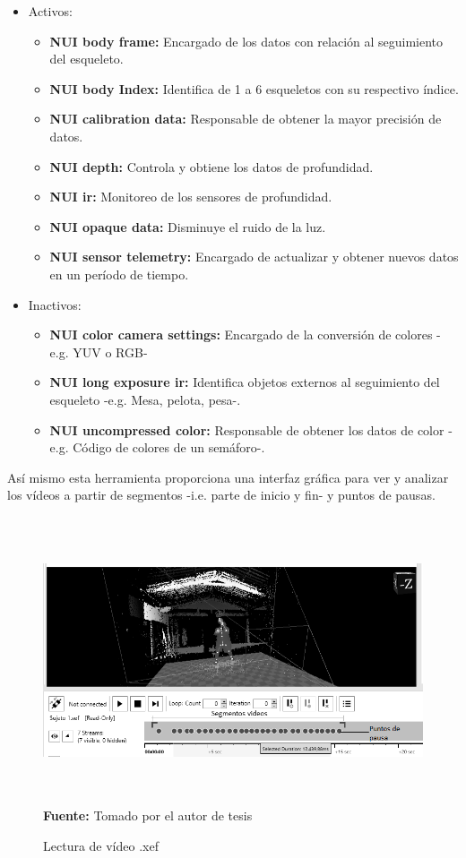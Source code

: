 \begin{itemize}
\item Activos:
\begin{itemize}
\item \textbf{NUI body frame:} Encargado de los datos con relaci\'on al seguimiento del esqueleto.
\item \textbf{NUI body Index:} Identifica de 1 a 6 esqueletos con su respectivo \'indice.
\item \textbf{NUI calibration data:} Responsable de obtener la mayor precisi\'on de datos.
\item \textbf{NUI depth:} Controla y obtiene los datos de profundidad.
\item \textbf{NUI ir:} Monitoreo de los sensores de profundidad.
\item \textbf{NUI opaque data:} Disminuye el ruido de la luz.
\item \textbf{NUI sensor telemetry:} Encargado de actualizar y obtener nuevos datos en un per\'iodo de tiempo.
\end{itemize}
\item Inactivos:
\begin{itemize}
\item \textbf{NUI color camera settings:} Encargado de la conversi\'on de colores -e.g. YUV o RGB-
\item \textbf{NUI long exposure ir:} Identifica  objetos externos al seguimiento del esqueleto -e.g. Mesa, pelota, pesa-.
\item \textbf{NUI uncompressed color:} Responsable de obtener los datos de color -e.g. C\'odigo de colores de un sem\'aforo-.
\end{itemize}
\end{itemize}
As\'i mismo esta herramienta proporciona una interfaz gr\'afica para ver y analizar los v\'ideos a partir de segmentos -i.e. parte de inicio y fin- y puntos de pausas.
\begin{figure}[H]
	\caption{Lectura de v\'ideo .xef }
	\label{fig:readVideoXEF}
	\centering
	\includegraphics[width=460px,height=320px]{graphics/readVideo.PNG} \\
	\textbf{Fuente:} Tomado por el autor de tesis
\end{figure} 
